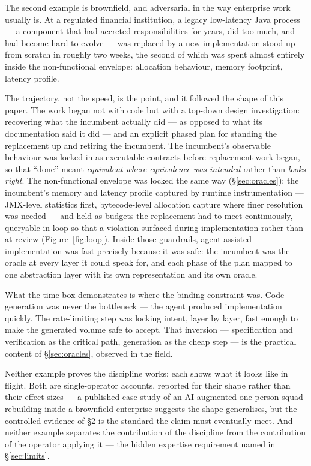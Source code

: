 \documentclass[11pt,a4paper,twocolumn]{article}
\begin{document}
The second example is brownfield, and adversarial in the way
enterprise work usually is. At a regulated financial institution,
a legacy low-latency Java process --- a
component that had accreted responsibilities for years, did too
much, and had become hard to evolve --- was replaced by a new implementation
stood up from scratch in roughly two weeks, the second of which
was spent almost entirely inside the non-functional envelope:
allocation behaviour, memory footprint, latency profile.

The trajectory, not the speed, is the point, and it followed the
shape of this paper. The work began not with code but with a
top-down design investigation: recovering what the incumbent
actually did --- as opposed to what its documentation said it did
--- and an explicit phased plan for standing the replacement up
and retiring the incumbent. The incumbent's observable behaviour
was locked in as executable contracts before replacement work
began, so that ``done'' meant \emph{equivalent where equivalence
was intended} rather than \emph{looks right}. The non-functional
envelope was locked the same way (\S\ref{sec:oracles}): the
incumbent's memory and latency profile captured by runtime
instrumentation --- JMX-level statistics first, bytecode-level
allocation capture where finer resolution was needed --- and held
as budgets the replacement had to meet continuously, queryable
in-loop so that a violation surfaced during implementation rather
than at review (Figure~\ref{fig:loop}). Inside those
guardrails, agent-assisted implementation was fast precisely
because it was safe: the incumbent was the oracle at every layer
it could speak for, and each phase of the plan mapped to one
abstraction layer with its own representation and its own oracle.

What the time-box demonstrates is where the binding constraint
was. Code generation was never the bottleneck --- the agent
produced implementation quickly. The rate-limiting step was
locking intent, layer by layer, fast enough to make the generated
volume safe to accept. That inversion --- specification and
verification as the critical path, generation as the cheap step
--- is the practical content of \S\ref{sec:oracles}, observed in
the field.

Neither example proves the discipline works; each shows what it
looks like in flight. Both are single-operator accounts,
reported for their shape rather than their effect sizes --- a
published case study of an AI-augmented one-person squad
rebuilding inside a brownfield enterprise
\citep{vilasboas2026onedeveloper} suggests the shape generalises,
but the controlled evidence of \S2 is the standard the claim must
eventually meet. And neither example separates the contribution of
the discipline from the contribution of the operator applying
it --- the hidden expertise requirement named in
\S\ref{sec:limits}.
\end{document}
